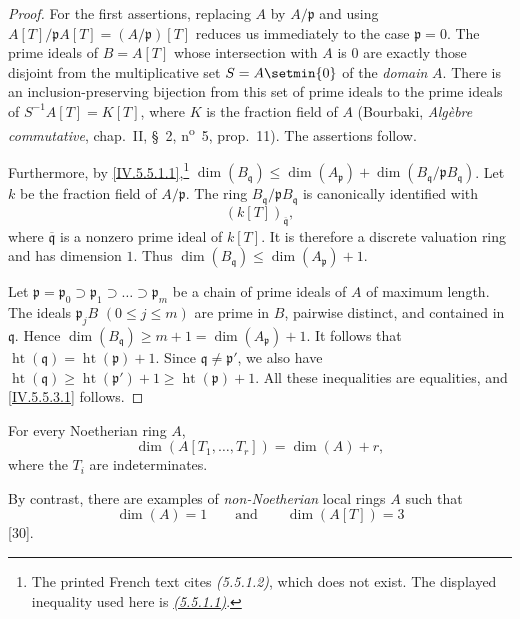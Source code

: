 \begin{proof}
For the first assertions, replacing $A$ by $A/\mathfrak p$ and using $A[T]/\mathfrak pA[T]=(A/\mathfrak p)[T]$
reduces us immediately to the case $\mathfrak p=0$.
The prime ideals of $B=A[T]$ whose intersection with $A$ is $0$ are
exactly those disjoint from the multiplicative set
$S=A\setmin\{0\}$ of the \emph{domain} $A$.
There is an inclusion-preserving bijection from this set of prime
ideals to the prime ideals of $S^{-1}A[T]=K[T]$,
where $K$ is the fraction field of $A$
(Bourbaki, \emph{Alg\`ebre commutative}, chap.~II, \S~2,
n\textsuperscript{o}~5, prop.~11).
The assertions follow.

Furthermore, by \eqref{IV.5.5.1.1},\footnote{The printed French text
cites \emph{(5.5.1.2)}, which does not exist.  The displayed
inequality used here is \emph{{\hyperref[IV.5.5.1.1]{(5.5.1.1)}}}.} $\dim(B_{\mathfrak q})
\leq\dim(A_{\mathfrak p})
+\dim(B_{\mathfrak q}/\mathfrak pB_{\mathfrak q})$.
Let $k$ be the fraction field of $A/\mathfrak p$.
The ring $B_{\mathfrak q}/\mathfrak pB_{\mathfrak q}$ is canonically
identified with
\[
(k[T])_{\overline{\mathfrak q}},
\]
where $\overline{\mathfrak q}$ is a nonzero prime ideal of $k[T]$.
It is therefore a discrete valuation ring and has dimension $1$.
Thus $\dim(B_{\mathfrak q})\leq\dim(A_{\mathfrak p})+1$.

Let $\mathfrak p=\mathfrak p_0
\supset\mathfrak p_1
\supset\ldots
\supset\mathfrak p_m$
be a chain of prime ideals of $A$ of maximum length.
The ideals $\mathfrak p_jB$ $(0\leq j\leq m)$ are prime in $B$,
pairwise distinct, and contained in $\mathfrak q$.
Hence $\dim(B_{\mathfrak q})
\geq m+1
=\dim(A_{\mathfrak p})+1$.
It follows that $\operatorname{ht}(\mathfrak q)
=\operatorname{ht}(\mathfrak p)+1$.
Since $\mathfrak q\neq\mathfrak p'$, we also have $\operatorname{ht}(\mathfrak q)
\geq\operatorname{ht}(\mathfrak p')+1
\geq\operatorname{ht}(\mathfrak p)+1$.
All these inequalities are equalities, and
\eqref{IV.5.5.3.1} follows.
\end{proof}

\begin{corollary}[5.5.4]
\label{IV.5.5.4}
For every Noetherian ring $A$,
\begin{equation}
\dim(A[T_1,\ldots,T_r])=\dim(A)+r,
\tag{5.5.4.1}\label{IV.5.5.4.1}
\end{equation}
where the $T_i$ are indeterminates.
\end{corollary}

By contrast, there are examples of \emph{non-Noetherian} local rings $A$
such that
\[
\dim(A)=1
\qquad\text{and}\qquad
\dim(A[T])=3
\]
[30].

